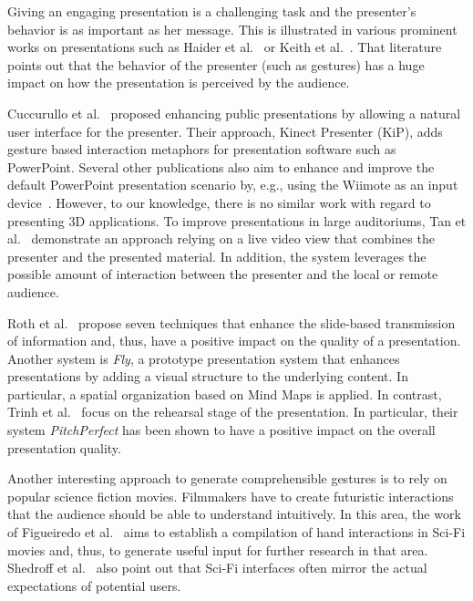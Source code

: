 \documentclass{sigchi}
\begin{document}
Giving an engaging presentation is a challenging task and the presenter’s behavior is as important as her message. This is illustrated in various prominent works on presentations such as Haider et al.~\cite{7472190} or Keith et al.~\cite{Curtis:2016:SIA:2993148.2993194}. That literature points out that the behavior of the presenter (such as gestures) has a huge impact on how the presentation is perceived by the audience.

Cuccurullo et al.~\cite{Cuccurullo:2012:GAP:2254556.2254584} proposed enhancing public presentations by allowing a natural user interface for the presenter. Their approach, Kinect Presenter (KiP), adds gesture based interaction metaphors for presentation software such as PowerPoint. Several other publications also aim to enhance and improve the default PowerPoint presentation scenario by, e.g., using the Wiimote as an input device~\cite{wiimote}. However, to our knowledge, there is no similar work with regard to presenting 3D applications. To improve presentations in large auditoriums, Tan et al.~\cite{Tan:2010:GAI:1873951.1874041} demonstrate an approach relying on a live video view that combines the presenter and the presented material. In addition, the system leverages the possible amount of interaction between the presenter and the local or remote audience.

Roth et al.~\cite{Roth:2015:PAP:2739011.2739026} propose seven techniques that enhance the slide-based transmission of information and, thus, have a positive impact on the quality of a presentation. Another system is \textit{Fly}\cite{Holman:2006:FOP:1125451.1125620}, a prototype presentation system that enhances presentations by adding a visual structure to the underlying content. In particular, a spatial organization based on Mind Maps is applied. In contrast, Trinh et al.~\cite{Trinh:2014:PIR:2611528.2557286} focus on the rehearsal stage of the presentation. In particular, their system \textit{PitchPerfect} has been shown to have a positive impact on the overall presentation quality.





Another interesting approach to generate comprehensible gestures is to rely on popular science fiction movies. Filmmakers have to create futuristic interactions that the audience should be able to understand intuitively. In this area, the work of Figueiredo et al.~\cite{Figueiredo:2015:OCH:2702613.2732888} aims to establish a compilation of hand interactions in Sci-Fi movies and, thus, to generate useful input for further research in that area. Shedroff et al.~\cite{Shedroff:2012:MSL:2254556.2254561} also point out that Sci-Fi interfaces often mirror the actual expectations of potential users.
\end{document}
